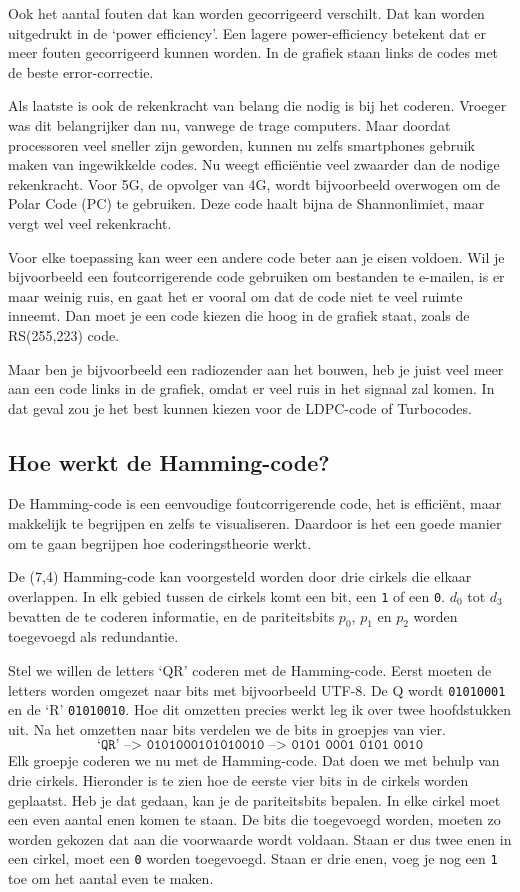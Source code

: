 \documentclass[a4paper]{article}
\begin{document}
Ook het aantal fouten dat kan worden gecorrigeerd verschilt. Dat kan worden uitgedrukt in de `power efficiency'. Een lagere power-efficiency betekent dat er meer fouten gecorrigeerd kunnen worden. In de grafiek staan links de codes met de beste error-correctie.

Als laatste is ook de rekenkracht van belang die nodig is bij het coderen. Vroeger was dit belangrijker dan nu, vanwege de trage computers. Maar doordat processoren veel sneller zijn geworden, kunnen nu zelfs smartphones gebruik maken van ingewikkelde codes. Nu weegt efficiëntie veel zwaarder dan de nodige rekenkracht. Voor 5G, de opvolger van 4G, wordt bijvoorbeeld overwogen om de Polar Code (PC) te gebruiken. Deze code haalt bijna de Shannonlimiet, maar vergt wel veel rekenkracht.

Voor elke toepassing kan weer een andere code beter aan je eisen voldoen. 
Wil je bijvoorbeeld een foutcorrigerende code gebruiken om bestanden te e-mailen, is er maar weinig ruis, en gaat het er vooral om dat de code niet te veel ruimte inneemt. Dan moet je een code kiezen die hoog in de grafiek staat, zoals de RS(255,223) code.

Maar ben je bijvoorbeeld een radiozender aan het bouwen, heb je juist veel meer aan een code links in de grafiek, omdat er veel ruis in het signaal zal komen. In dat geval zou je het best kunnen kiezen voor de LDPC-code of Turbocodes.

\subsection{Hoe werkt de Hamming-code?}
De Hamming-code is een eenvoudige foutcorrigerende code, het is efficiënt, maar makkelijk te begrijpen en zelfs te visualiseren. Daardoor is het een goede manier om te gaan begrijpen hoe coderingstheorie werkt.

De (7,4) Hamming-code kan voorgesteld worden door drie cirkels die elkaar overlappen. In elk gebied tussen de cirkels komt een bit, een \texttt{1} of een \texttt{0}. $d_0$ tot $d_3$ bevatten de te coderen informatie, en de pariteitsbits $p_0$, $p_1$ en $p_2$ worden toegevoegd als redundantie.

Stel we willen de letters `QR' coderen met de Hamming-code. Eerst moeten de letters worden omgezet naar bits met bijvoorbeeld UTF-8. De Q wordt \texttt{01010001} en de `R' \texttt{01010010}. Hoe dit omzetten precies werkt leg ik over twee hoofdstukken uit.
Na het omzetten naar bits verdelen we de bits in groepjes van vier.
\[\texttt{`QR' --> 0101000101010010 --> 0101 0001 0101 0010}\]
Elk groepje coderen we nu met de Hamming-code. Dat doen we met behulp van drie cirkels. Hieronder is te zien hoe de eerste vier bits in de cirkels worden geplaatst. Heb je dat gedaan, kan je de pariteitsbits bepalen. In elke cirkel moet een even aantal enen komen te staan. De bits die toegevoegd worden, moeten zo worden gekozen dat aan die voorwaarde wordt voldaan. Staan er dus twee enen in een cirkel, moet een \texttt{0} worden toegevoegd. Staan er drie enen, voeg je nog een \texttt{1} toe om het aantal even te maken.
\end{document}
